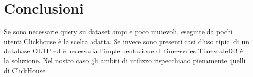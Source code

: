 \section{Conclusioni}
Se sono necessarie query su dataset ampi e poco mutevoli, eseguite da pochi utenti Clickhouse è la scelta adatta.
Se invece sono presenti casi d’uso tipici di un database OLTP ed è necessaria l'implementazione di time-series TimescaleDB è la soluzione.
Nel nostro caso gli ambiti di utilizzo rispecchiano pienamente quelli di ClickHouse.





